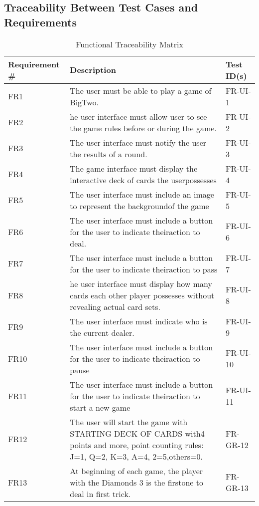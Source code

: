 \documentclass[12pt, titlepage]{article}
\begin{document}
\subsection{Traceability Between Test Cases and Requirements}
\begin{table}[h!]
\centering
\caption{Functional Traceability Matrix}
\label{table:1}
\begin{tabular}{|p{2.5cm} p{10cm} p{2.5cm}|} 
 \hline
 Requirement \# & Description & Test ID(s) \\ 
 \hline
 FR1 & The user must be able to play a game of BigTwo. & FR-UI-1 \\ 
 FR2 & he  user  interface  must  allow  user  to  see  the  game  rules  before  or during the game. & FR-UI-2 \\ 
 FR3 & The user interface must notify the user the results of a round. & FR-UI-3 \\ 
 FR4 & The game interface must display the interactive deck of cards the userpossesses & FR-UI-4 \\ 
 FR5 & The user interface must include an image to represent the backgroundof the game & FR-UI-5 \\ 
 FR6 & The user interface must include a button for the user to indicate theiraction to deal. & FR-UI-6 \\ 
 FR7 & The user interface must include a button for the user to indicate theiraction to pass & FR-UI-7 \\ 
 FR8 & he  user  interface  must  display  how  many  cards  each  other player possesses without revealing actual card sets. & FR-UI-8 \\
 FR9 & The user interface must indicate who is the current dealer. & FR-UI-9 \\ 
 FR10 & The user interface must include a button for the user to indicate theiraction to pause & FR-UI-10 \\ 
 FR11 & The user interface must include a button for the user to indicate theiraction to start a new game & FR-UI-11 \\ 
 FR12 & The user will start the game with STARTING DECK OF CARDS with4 points and more, point counting rules:  J=1, Q=2, K=3, A=4, 2=5,others=0. & FR-GR-12 \\ 
 FR13 & At beginning of each game, the player with the Diamonds 3 is the firstone to deal in first trick. & FR-GR-13 \\ 
 
 \hline
\end{tabular}
\end{table}
\end{document}
